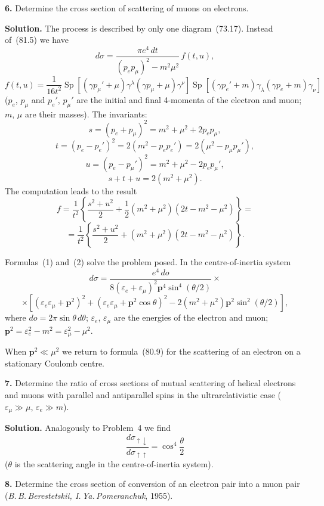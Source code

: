\textbf{6.} Determine the cross section of scattering of muons on electrons.

\textbf{Solution.} The process is described by only one diagram~(73.17). Instead of~(81.5) we have
\begin{equation}
d\sigma = \frac{\pi e^4\,dt}{(p_e p_\mu)^2 - m^2\mu^2}\,f(t,u), \tag{1}
\end{equation}
\[
f(t,u) = \frac{1}{16t^2}\operatorname{Sp}[(\gamma p_\mu' + \mu)\gamma^\lambda(\gamma p_\mu + \mu)\gamma^\nu]\operatorname{Sp}[(\gamma p_e' + m)\gamma_\lambda(\gamma p_e + m)\gamma_\nu]
\]
($p_e$, $p_\mu$ and $p_e'$, $p_\mu'$ are the initial and final 4-momenta of the electron and muon; $m$, $\mu$ are their masses). The invariants:
\[
s = (p_e + p_\mu)^2 = m^2 + \mu^2 + 2p_e p_\mu,
\]
\[
t = (p_e - p_e')^2 = 2(m^2 - p_e p_e') = 2(\mu^2 - p_\mu p_\mu'),
\]
\[
u = (p_e - p_\mu')^2 = m^2 + \mu^2 - 2p_e p_\mu',
\]
\[
s + t + u = 2(m^2 + \mu^2).
\]
The computation leads to the result
\begin{equation}
f = \frac{1}{t^2}\left\{\frac{s^2+u^2}{2}+\frac{1}{2}(m^2+\mu^2)(2t-m^2-\mu^2)\right\} =
\end{equation}
\[
= \frac{1}{t^2}\left\{\frac{s^2+u^2}{2}+(m^2+\mu^2)(2t-m^2-\mu^2)\right\}.\tag{2}
\]

Formulas~(1) and~(2) solve the problem posed. In the centre-of-inertia system
\[
d\sigma = \frac{e^4\,do}{8(\varepsilon_e + \varepsilon_\mu)^2\mathbf{p}^4\sin^4(\theta/2)} \times
\]
\[
\times [(\varepsilon_e\varepsilon_\mu+\mathbf{p}^2)^2+(\varepsilon_e\varepsilon_\mu+\mathbf{p}^2\cos\theta)^2-2(m^2+\mu^2)\mathbf{p}^2\sin^2(\theta/2)],
\]
where $do = 2\pi\sin\theta\,d\theta$; $\varepsilon_e$, $\varepsilon_\mu$ are the energies of the electron and muon; $\mathbf{p}^2 = \varepsilon_e^2 - m^2 = \varepsilon_\mu^2 - \mu^2$.

When $\mathbf{p}^2 \ll \mu^2$ we return to formula~(80.9) for the scattering of an electron on a stationary Coulomb centre.

\textbf{7.} Determine the ratio of cross sections of mutual scattering of helical electrons and muons with parallel and antiparallel spins in the ultrarelativistic case ($\varepsilon_\mu \gg \mu$, $\varepsilon_e \gg m$).

\textbf{Solution.} Analogously to Problem~4 we find
\[
\frac{d\sigma_{\uparrow\downarrow}}{d\sigma_{\uparrow\uparrow}} = \cos^4\frac{\theta}{2}
\]
($\theta$ is the scattering angle in the centre-of-inertia system).

\textbf{8.} Determine the cross section of conversion of an electron pair into a muon pair (\textit{B.\,B.\,Berestetskii, I.\,Ya.\,Pomeranchuk}, 1955).

